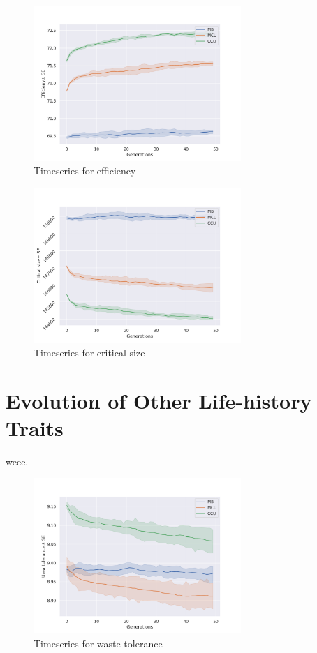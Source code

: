 \begin{figure}[p]
  \centering
  \includegraphics[trim = 0 0 50 50, clip, width=0.7\textwidth]{C4/Figs/eff}
  \caption{Timeseries for efficiency}
  \label{eff}
\end{figure}
\begin{figure}[p]
  \centering
  \includegraphics[trim = 0 0 50 50, clip, width=0.7\textwidth]{C4/Figs/mc}
  \caption{Timeseries for critical size}
  \label{mc}
\end{figure}

\newpage
\section{Evolution of Other Life-history Traits}
weee.
\begin{figure}[t]
  \centering
  \includegraphics[trim = 0 0 50 50, clip, width=0.7\textwidth]{C4/Figs/wtol}
  \caption{Timeseries for waste tolerance}
  \label{wtol}
\end{figure}
\pagebreak

